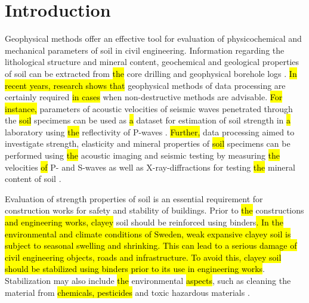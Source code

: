 \documentclass[USenglish,twocolumn]{article}
\begin{document}



  
\maketitle

\section{Introduction}

Geophysical methods offer an effective tool for evaluation of physicochemical and mechanical parameters of soil in civil engineering. Information regarding the lithological structure and mineral content, geochemical and geological properties of soil can be extracted from \hl{the }core drilling and geophysical borehole logs \cite{MAUCEC2009194,JING2021101534}. \hl{In recent years, research shows that }geophysical methods of data processing are certainly required \hl{in cases} when non-destructive methods are advisable. \hl{For instance, }parameters of acoustic velocities of seismic waves penetrated through the \hl{soil }specimens can be used as \hl{a }dataset for estimation of soil strength in \hl{a} laboratory using \hl{the }reflectivity of P-waves \cite{Lindh202102,Lindh202210}. \hl{Further, }data processing aimed to investigate strength, elasticity and mineral properties of \hl{soil }specimens can be performed using \hl{the }acoustic imaging and seismic testing by measuring \hl{the }velocities \hl{of }P- and S-waves \cite{Tang2009,Tronicke,Hadden} as well as X-ray-diffractions for testing \hl{the }mineral content of soil \cite{Wang}. 

Evaluation of strength properties of soil is an essential requirement for construction works for safety and stability of buildings. Prior to \hl{the }constructions\hl{ and engineering works, clayey }soil should be reinforced using binders\hl{. In the environmental and climate conditions of Sweden, weak expansive clayey soil is subject to seasonal swelling and shrinking. This can lead to a serious damage of civil engineering objects, roads and infrastructure. To avoid this, clayey soil should be stabilized using binders prior to its use in engineering works}. Stabilization may also include \hl{the }environmental \hl{aspects}, such as cleaning the material from \hl{chemicals, pesticides} \cite{CONTESSI2021141826,Lemenkova202222} and toxic hazardous materials  \cite{Lindh202201}. 
\end{document}
